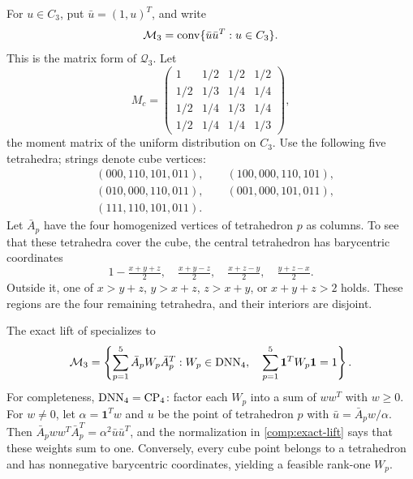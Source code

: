 For $u\in C_3$, put $\bar u=(1,u)^T$, and write
\[
 \mathcal M_3
   =\operatorname{conv}\{\bar u\bar u^T:u\in C_3\}.
\]
This is the matrix form of $\mathcal Q_3$. Let
\begin{equation}\label{comp:uniform}
 M_c=\begin{pmatrix}
 1&1/2&1/2&1/2\\
 1/2&1/3&1/4&1/4\\
 1/2&1/4&1/3&1/4\\
 1/2&1/4&1/4&1/3
 \end{pmatrix},
\end{equation}
the moment matrix of the uniform distribution on $C_3$.
Use the following five tetrahedra; strings denote cube vertices:
\begin{equation}\label{comp:tetrahedra}
 \begin{split}
 &(000,110,101,011),\qquad(100,000,110,101),\\
 &(010,000,110,011),\qquad(001,000,101,011),\\
 &(111,110,101,011).
 \end{split}
\end{equation}
Let $\bar A_p$ have the four homogenized vertices of tetrahedron $p$
as columns. To see that these tetrahedra cover the cube, the central
tetrahedron has barycentric coordinates
\[
 1-\tfrac{x+y+z}{2},\quad\tfrac{x+y-z}{2},\quad
 \tfrac{x+z-y}{2},\quad\tfrac{y+z-x}{2}.
\]
Outside it, one of $x>y+z$, $y>x+z$, $z>x+y$, or $x+y+z>2$
holds. These regions are the four remaining tetrahedra, and their interiors
are disjoint.

The exact lift of \citet{AnstreicherBurer2010} specializes to
\begin{equation}\label{comp:exact-lift}
 \mathcal M_3
 =\left\{\sum_{p=1}^5\bar A_pW_p\bar A_p^T:
      W_p\in\operatorname{DNN}_4,\quad
      \sum_{p=1}^5\mathbf1^TW_p\mathbf1=1\right\}.
\end{equation}
For completeness, $\operatorname{DNN}_4=\operatorname{CP}_4$: factor each $W_p$ into a sum of
$ww^T$ with $w\geq0$. For $w\ne0$, let
$\alpha=\mathbf1^Tw$ and $u$ be the point of tetrahedron $p$ with
$\bar u=\bar A_pw/\alpha$. Then
$\bar A_pww^T\bar A_p^T=\alpha^2\bar u\bar u^T$, and the
normalization in \eqref{comp:exact-lift} says that these weights sum to one.
Conversely, every cube point belongs to a tetrahedron and has nonnegative
barycentric coordinates, yielding a feasible rank-one $W_p$.

